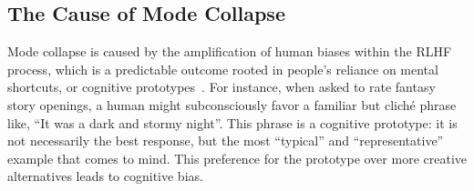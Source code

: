 

\subsection{The Cause of Mode Collapse}\label{sec:cause_of_mode_collapse}
Mode collapse is caused by the amplification of human biases within the RLHF process, which is a predictable outcome rooted in people's reliance on mental shortcuts, or cognitive prototypes~\citep{rosch1973natural, judgement_bias}. For instance, when asked to rate fantasy story openings, a human might subconsciously favor a familiar but cliché phrase like, ``It was a dark and stormy night''. This phrase is a cognitive prototype: it is not necessarily the best response, but the most ``typical'' and ``representative'' example that comes to mind. This preference for the prototype over more creative alternatives leads to cognitive bias.

